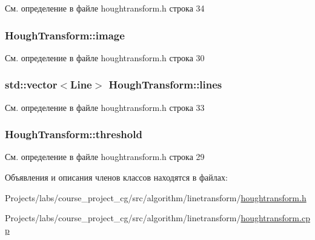 См. определение в файле houghtransform.\+h строка 34

\subsubsection[{\texorpdfstring{image}{image}}]{ Hough\+Transform\+::image\hspace{0.3cm}{\ttfamily [private]}}\hypertarget{class_hough_transform_a0fe725cb1f0e3078096c3d7e9dee85f7}{}\label{class_hough_transform_a0fe725cb1f0e3078096c3d7e9dee85f7}


См. определение в файле houghtransform.\+h строка 30

\subsubsection[{\texorpdfstring{lines}{lines}}]{\setlength{\rightskip}{0pt plus 5cm}std\+::vector$<${\bf Line}$>$ Hough\+Transform\+::lines\hspace{0.3cm}{\ttfamily [private]}}\hypertarget{class_hough_transform_abb2e77efd0688f3ea508c5f51b480f22}{}\label{class_hough_transform_abb2e77efd0688f3ea508c5f51b480f22}


См. определение в файле houghtransform.\+h строка 33

\subsubsection[{\texorpdfstring{threshold}{threshold}}]{ Hough\+Transform\+::threshold\hspace{0.3cm}{\ttfamily [private]}}\hypertarget{class_hough_transform_aa9de5274a062b1725689fbbc6f0799f7}{}\label{class_hough_transform_aa9de5274a062b1725689fbbc6f0799f7}


См. определение в файле houghtransform.\+h строка 29



Объявления и описания членов классов находятся в файлах\+:\begin{DoxyCompactItemize}
\item 
Projects/labs/course\+\_\+project\+\_\+cg/src/algorithm/linetransform/\hyperlink{houghtransform_8h}{houghtransform.\+h}\item 
Projects/labs/course\+\_\+project\+\_\+cg/src/algorithm/linetransform/\hyperlink{houghtransform_8cpp}{houghtransform.\+cpp}\end{DoxyCompactItemize}
